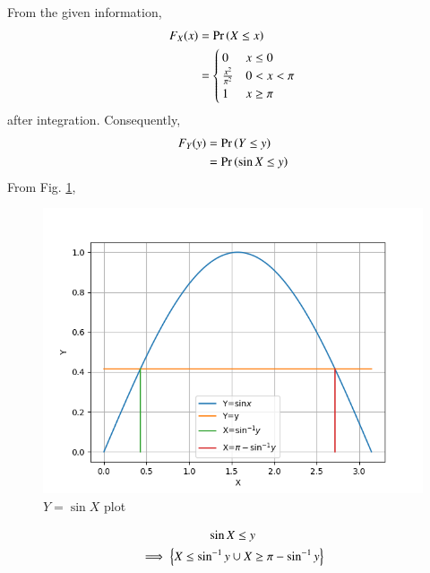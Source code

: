 From the given information, 
\begin{align}
    F_X(x) &= \Pr\left(X\leq x\right)\\
    &=\begin{cases} 
            0 & x\le 0\\
            \frac{x^2}{\pi^2}  &  0<x<\pi\\
            1 & x\ge \pi
            \end{cases}
            \label{trans/1/a}
\end{align}
after integration.  Consequently, 
\begin{align}
    F_Y(y) &= \Pr\left(Y\leq y\right)\\
     &= \Pr\left(\sin{X}\leq y\right)
\end{align}
From Fig. \ref{trans/1/plot}, 
\begin{figure}[!ht]
    \centering
    \includegraphics[width=\linewidth]{trans/solutions/1/plot.png}
    \caption{$Y=\sin X$ plot}
    \label{trans/1/plot}
\end{figure}
%
\begin{multline}
    \sin{X}\leq y 
    \\
    \implies \left\{X\leq \sin^{-1}{y} \cup X\geq \pi-\sin^{-1}{y}\right\} 
\end{multline}
